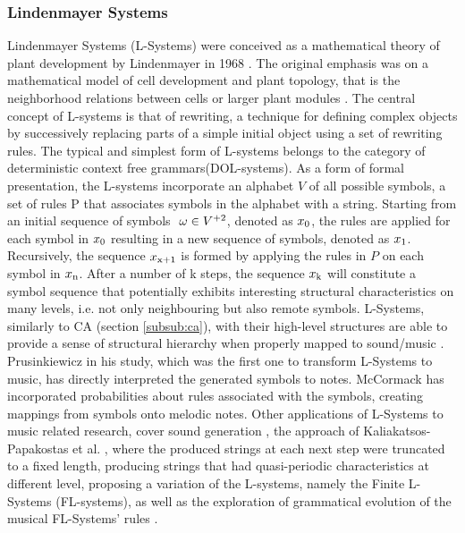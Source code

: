        \subsubsection{Lindenmayer Systems}
        Lindenmayer Systems (L-Systems) were conceived as a mathematical theory of plant development by Lindenmayer in 1968 \cite{lindenmayer1968mathematical}. The original emphasis was on a mathematical model of cell development and plant topology, that is the neighborhood relations between cells or larger plant modules \cite{prusinkiewicz2012algorithmic}. The central concept of L-systems is that of rewriting, a technique for defining complex objects by successively replacing parts of a simple initial object using a set of rewriting rules. The typical and simplest form of L-systems belongs to the category of deterministic context free grammars(DOL-systems). As a form of formal presentation, the L-systems incorporate an alphabet $V$ of all possible symbols, a set of rules P that associates symbols in the alphabet with a string. Starting from an initial sequence of symbols $\ \omega \in V\textsuperscript{+2}$, denoted as $x\textsubscript{0}$, the rules are applied for each symbol in $x\textsubscript{0}$ resulting in a new sequence of symbols, denoted as $x\textsubscript{1}$. Recursively, the sequence $x\textsubscript{x+1}$ is formed by applying the rules in $P$ on each symbol in $x\textsubscript{n}$. After a number of k steps, the sequence $x\textsubscript{k}$ will constitute a symbol sequence that potentially exhibits interesting structural characteristics on many levels, i.e. not only neighbouring but also remote symbols. L-Systems, similarly to CA (section \ref{subsub:ca}), with their high-level structures are able to provide a sense of structural hierarchy when properly mapped to sound/music \cite{maxim_kal_pap_book}. Prusinkiewicz \cite{prusinkiewicz1986graphical} in his study, which was the first one to transform L-Systems to music, has directly interpreted the generated symbols to notes. McCormack \cite{mccormack1996grammar} has incorporated probabilities about rules associated with the symbols, creating mappings from symbols onto melodic notes. Other applications of L-Systems to music related research, cover sound generation \cite{manousakis2006musical}, the approach of Kaliakatsos-Papakostas et al. \cite{kaliakatsos2012intelligent}, where the produced strings at each next step were truncated to a fixed length, producing strings that had quasi-periodic characteristics at different level, proposing a variation of the L-systems, namely the Finite L-Systems (FL-systems), as well as the exploration of grammatical evolution of the musical FL-Systems' rules \cite{kaliakatsos2012genetic, maxim_kal_pap_book}.


